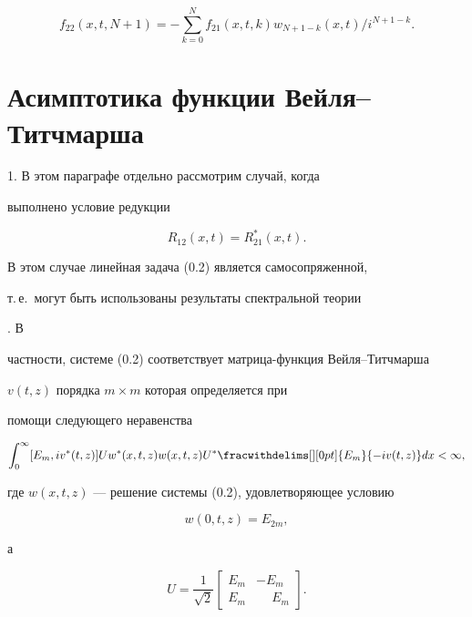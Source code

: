 $$ 


f_{22}(x,t,N+1)=-\sum^N_{k=0}f_{21}(x,t,k) 


w_{N+1-k}(x,t)/i^{N+1-k}. 


$$ 


 


\section{Асимптотика функции Вейля--Титчмарша} 


 


1. В этом параграфе отдельно рассмотрим случай, когда  


выполнено условие редукции 


\begin{equation} 


R_{12}(x,t)=R^*_{21}(x,t). 


\end{equation} 


В этом случае линейная задача (0.2) является самосопряженной, 


т.\,е.~могут быть использованы результаты спектральной теории 


\cite{1}. В 


частности, системе (0.2) соответствует матрица-функция Вейля--Титчмарша 


$v(t,z)$ порядка $m\times m$ которая определяется при 


помощи следующего неравенства 


$$ 


\int^\infty_0[E_m,i v^*(t,z)]U w^*(x,t,z)w(x,t,z) 


U^*\fracwithdelims[][0pt]{E_m}{-i v(t,z)}dx<\infty, 


$$ 


где $w(x,t,z)$ --- решение системы (0.2), удовлетворяющее условию 


$$ 


w(0,t,z)=E_{2m},


$$ 


а 


\begin{equation} 


U=\frac{1}{\sqrt{2}} 


\begin{bmatrix} 


E_m & -E_m \\ E_m & \phantom{-}E_m 


\end{bmatrix} 


. 


\end{equation} 


